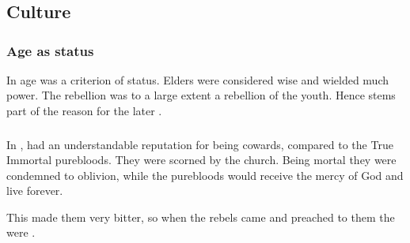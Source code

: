 \section[Merkyrah]{\Merkyrah}









\subsection{Culture}





\subsubsection{Age as status}
In \Merkyrah age was a criterion of status. 
Elders were considered wise and wielded much power.
The rebellion was to a large extent a rebellion of the youth.
Hence stems part of the reason for the later .





\subsubsection{\Bezedeth}
In \Merkyrah, \bezedeth had an understandable reputation for being cowards, compared to the True Immortal purebloods. 
They were scorned by the \Merkyran church. 
Being mortal they were condemned to oblivion, while the purebloods would receive the mercy of God and live forever. 

This made them very bitter, so when the rebels came and preached to them the \bezedeth were .

